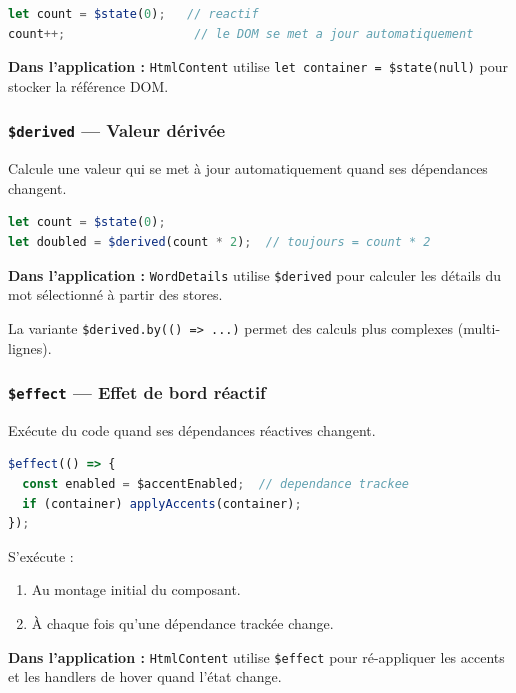 \begin{lstlisting}[language=javascript]
let count = $state(0);   // reactif
count++;                  // le DOM se met a jour automatiquement
\end{lstlisting}

\textbf{Dans l'application :} \texttt{HtmlContent} utilise \texttt{let container = \$state(null)} pour stocker la référence DOM.

\subsubsection{\texttt{\$derived} --- Valeur dérivée}

Calcule une valeur qui se met à jour automatiquement quand ses dépendances changent.

\begin{lstlisting}[language=javascript]
let count = $state(0);
let doubled = $derived(count * 2);  // toujours = count * 2
\end{lstlisting}

\textbf{Dans l'application :} \texttt{WordDetails} utilise \texttt{\$derived} pour calculer les détails du mot sélectionné à partir des stores.

La variante \texttt{\$derived.by(() => ...)} permet des calculs plus complexes (multi-lignes).

\subsubsection{\texttt{\$effect} --- Effet de bord réactif}

Exécute du code quand ses dépendances réactives changent.

\begin{lstlisting}[language=javascript]
$effect(() => {
  const enabled = $accentEnabled;  // dependance trackee
  if (container) applyAccents(container);
});
\end{lstlisting}

S'exécute :
\begin{enumerate}
  \item Au montage initial du composant.
  \item À chaque fois qu'une dépendance trackée change.
\end{enumerate}

\textbf{Dans l'application :} \texttt{HtmlContent} utilise \texttt{\$effect} pour ré-appliquer les accents et les handlers de hover quand l'état change.

